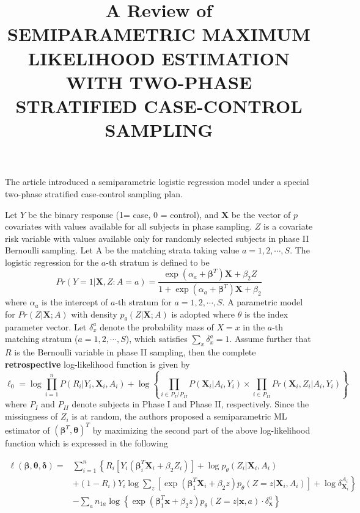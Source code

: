 \documentclass[11pt]{article}
\title{A Review of \\ SEMIPARAMETRIC MAXIMUM LIKELIHOOD ESTIMATION WITH TWO-PHASE STRATIFIED CASE-CONTROL SAMPLING}
\begin{document}
	\maketitle	

The article introduced a semiparametric logistic regression model under a special two-phase stratified case-control sampling plan.

Let $Y$ be the binary response (1= case, 0 = control), and $\mathbf{X}$ be the vector of $p$ covariates with values available for all subjects in phase sampling. $Z$ is a covariate risk variable with values available only for randomly selected subjects in phase II Bernoulli sampling. Let A be the matching strata taking value $a = 1, 2, \cdots, S$.  The logistic regression for the $a$-th stratum is defined to be
$$
Pr(Y=1|\mathbf{X}, Z: A = a) = \frac{\exp(\alpha_a + \mathbf{\beta}^T)\mathbf{X} + \beta_2Z}{1+\exp(\alpha_a + \mathbf{\beta}^T)\mathbf{X} + \beta_2}
$$
\noindent where $\alpha_a$ is the intercept of $a$-th stratum for $a = 1, 2, \cdots, S$. A parametric model for $Pr(Z | \mathbf{X}; A)$ with density $p_{\theta} (Z | \mathbf{X}; A)$ is adopted where $\theta$ is the index parameter vector. Let $\delta_x^a$ denote the probability mass of $X = x$ in the $a$-th matching stratum
($a = 1,2, \cdots, S$), which satisfies $\sum_x \delta_x^a = 1$.  Assume further that $R$ is the Bernoulli variable in phase II sampling, then the complete {\bf retrospective} log-likelihood function is given by
$$
\ell_0= \log \prod_{i=1}^nP(R_i|Y_i, \mathbf{X}_i, A_i) +\log\left\{ \prod_{i \in P_I/P_{II}} P(\mathbf{X}_i|A_i, Y_i) \times \prod_{i \in P_{II}}Pr(\mathbf{X}_i,Z_i|A_i, Y_i) \right\} 
$$
where $P_I$ and $P_{II}$ denote subjects in Phase I and Phase II, respectively. Since the missingness of $Z_i$ is at random, the authors proposed a semiparametric ML estimator of $(\mathbf{\beta}^T, \mathbf{\theta})^T$ by maximizing the second part of the above log-likelihood function which is expressed in the following

\begin{equation}
	\begin{aligned}
		\ell(\mathbf{\beta}, \mathbf{\theta}, \mathbf{\delta}) = & \sum_{i=1}^n \left\{ R_i[Y_i(\mathbf{\beta}_i^T\mathbf{X}_i+\beta_2Z_i)] +\log p_{\theta}(Z_i|\mathbf{X}_i,A_i) \right.  \\
		& \left.+ (1-R_i)Y_i\log\sum_z [ \exp(\mathbf{\beta}_1^T\mathbf{X}_i + \beta_2z)p_{\theta}(Z=z|\mathbf{X}_i, A_i)] + \log \delta_{\mathbf{X}_i}^{A_i}  \right\} \\
		& -\sum_a n_{1a}\log\left\{\exp(\mathbf{\beta}_1^T\mathbf{x}+\beta_2z)p_{\theta}(Z=z|\mathbf{x}, a)\cdot\delta_{\mathbf{x}}^a \right\}
	\end{aligned}
\end{equation}
\end{document}
